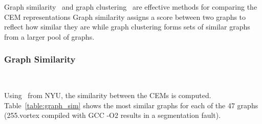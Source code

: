 Graph similarity~\cite{graphsim-zager, graphsim-blondel} and graph
clustering~\cite{graphcluster-bunke} are
effective methods for comparing the CEM representations Graph similarity assigns a score between
two graphs to reflect how similar they are while graph clustering forms sets of
similar graphs from a larger pool of graphs.


\subsubsection{Graph Similarity}~\label{sec:meth_graph_sim}

Using~\cite{graphsim-nyu} from NYU, the similarity
between the CEMs is computed. Table~\ref{table:graph_sim} shows the most similar
graphs for each of the 47 graphs (255.vortex compiled with GCC -O2 results in a
segmentation fault).

